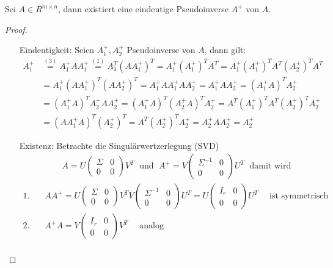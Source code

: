 \begin{Satz}
  Sei $A \in R^{m \times n}$, dann existiert eine eindeutige Pseudoinverse $A^+$ von $A$.
\end{Satz}
\begin{proof}
\quad \\
\begin{enumerate}
  \item[Eindeutigkeit:] Seien $A_1^+, A_2^+$ Pseudoinverse von $A$, dann gilt:
  \begin{align*}
    A_1^+ &\overset{(3)}= A_1^+ A A_1^+ \overset{(1)}=A_1^T(A A_1^+)^T = A_1^+(A_1^+)^T A^T
    = A_1^+ (A_1^+)^T A^T (A_2^+)^T A^T\\
    &= A_1^+ (A A_1^+)^T (A A_2^+)^T = A_1^+ A A_1^+ A A_2^+ = A_1^+ A A_2^+
    = (A_1^+ A)^T A_2^+ \\
    &= (A_1^+ A)^T A_2^+ A A_2^+ = (A_1^+ A)^T (A_2^+ A)^T A_2^+
    = A^T (A_1^+)^T A^T (A_2^+)^T A_2^+\\
    &= (A A_1^+ A)^T (A_2^+)^T = A^T (A_2^+)^T A_2^+ = A_2^+ A A_2^+ = A_2^+
  \end{align*}
  \item[Existenz:]Betrachte die Singulärwertzerlegung (SVD)
  \begin{align*}
     & \qquad A = U \begin{pmatrix}\varSigma & 0 \\ 0 & 0 \end{pmatrix} V^T\; \text{ und } \;
     A^+ = V \begin{pmatrix}\varSigma^{-1} & 0 \\ 0 & 0 \end{pmatrix} U^T\;\text{ damit wird } \\
     1. \quad & A A^+ = U \begin{pmatrix}\varSigma & 0 \\ 0 & 0 \end{pmatrix} V^T
     V \begin{pmatrix}\varSigma^{-1} & 0 \\ 0 & 0 \end{pmatrix} U^T =
     U \begin{pmatrix}I_r & 0 \\ 0 & 0 \end{pmatrix} U^T \quad \text{ ist symmetrisch}\\
     2. \quad & A^+ A = V \begin{pmatrix}I_r & 0 \\ 0 & 0 \end{pmatrix} V^T \quad \text{ analog} \\

\end{align*}
\end{enumerate}
\end{proof}
